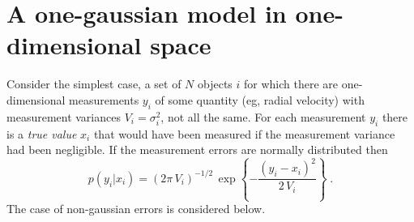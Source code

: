\documentclass{article}
\begin{document}








\section{A one-gaussian model in one-dimensional space}

Consider the simplest case, a set of $N$ objects $i$ for which there
are one-dimensional measurements $y_i$ of some quantity (eg, radial
velocity) with measurement variances $V_i=\sigma^2_i$, not all the
same.  For each measurement $y_i$ there is a \emph{true value} $x_i$
that would have been measured if the measurement variance had been
negligible.  If the measurement errors are normally distributed then
\begin{equation}
p(y_i|x_i)=\left(2\pi\,V_i\right)^{-1/2}\,\exp\left\{-\frac{(y_i-x_i)^2}{2\,V_i}\right\} \;.
\end{equation}
The case of non-gaussian errors is considered below.
\end{document}
